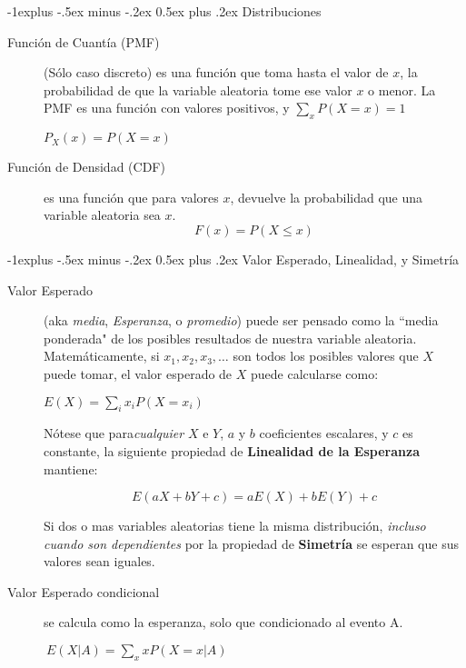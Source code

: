\documentclass[10pt,landscape]{article}
\makeatletter
\renewcommand{\subsection}{\@startsection{subsection}{2}{0mm}%
                                {-1explus -.5ex minus -.2ex}%
                                {0.5ex plus .2ex}%
                                {\normalfont\normalsize\bfseries}}
\makeatother
\begin{document}
\begin{multicols}{3}
\subsection{Distribuciones}
\begin{description}

\item[Función de Cuantía (PMF)] (Sólo caso discreto) es una función que toma hasta el valor de $x$, la probabilidad de que la variable aleatoria tome ese valor $x$ o menor. La PMF es una función con valores positivos, y $\sum_xP(X=x) = 1$
\begin{center}
$P_X(x) = P(X=x)$
\end{center}

\item[Función de Densidad (CDF)] es una función que para valores $x$, devuelve la probabilidad que una variable aleatoria sea $x$.
\[F(x) = P(X \leq x)\]


\end{description}


\subsection{Valor Esperado, Linealidad, y Simetría}
\begin{description}
\item[Valor Esperado] (aka \emph{media}, \emph{Esperanza}, o \emph{promedio}) puede ser pensado como la ``media ponderada" de los posibles resultados de nuestra variable aleatoria. Matemáticamente, si $x_1, x_2, x_3, \dots$ son todos los posibles valores que $X$ puede tomar, el valor esperado de $X$ puede calcularse como:
\begin{center}
$E(X) = \sum\limits_{i}x_iP(X=x_i)$
\end{center}
Nótese que para\emph{cualquier} $X$ e $Y$, $a$ y $b$ coeficientes escalares, y $c$ es constante, la siguiente propiedad de \textbf{Linealidad de la Esperanza} mantiene:

\[E(aX + bY + c) = aE(X) + bE(Y) + c \]

Si dos o mas variables aleatorias tiene la misma distribución, \emph{incluso cuando son dependientes} por la propiedad de \textbf{Simetría} se esperan que sus valores sean iguales.

\item[Valor Esperado condicional] se calcula como la esperanza, solo que condicionado al evento A. \begin{center}
$\ E(X | A) = \sum\limits_{x}xP(X=x | A)$
\end{center}


\end{description}
\end{multicols}
\end{document}
